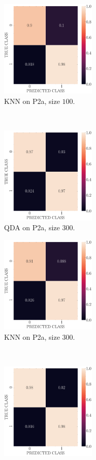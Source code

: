 \documentclass[11pt, a4 paper]{article}
\begin{document}
\begin{figure}[!htbp]
\begin{subfigure}[!htbp]{0.24\textwidth}
       \centering
       \includegraphics[width=1.8in]{../results/ex2/conf_mtx_KNN_dataset_P2a_size_100.pdf}
       \caption{KNN on P2a, size $100$.}
       \label{fig:KNN_rr20_P2a_100}
    \end{subfigure}
\\
    \begin{subfigure}[!htbp]{0.24\textwidth}
       \centering
       \includegraphics[width=1.8in]{../results/ex2/conf_mtx_QD_ML_dataset_P2a_size_300.pdf}
       \caption{QDA on P2a, size $300$.}
       \label{fig:QDA_rr20_P2a_300}
    \end{subfigure}
\quad    
    \begin{subfigure}[!htbp]{0.24\textwidth}
       \centering
       \includegraphics[width=1.8in]{../results/ex2/conf_mtx_KNN_dataset_P2a_size_300.pdf}
       \caption{KNN on P2a, size $300$.}
       \label{fig:KNN_rr20_P2a_300}
    \end{subfigure}
\\
    \begin{subfigure}[!htbp]{0.24\textwidth}
       \centering
       \includegraphics[width=1.8in]{../results/ex2/conf_mtx_QD_ML_dataset_P2a_size_999.pdf}

\end{subfigure}
\end{figure}
\end{document}
